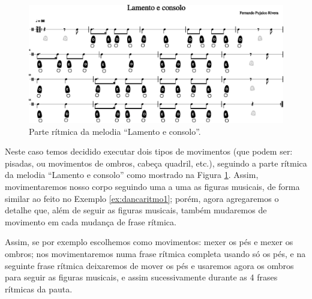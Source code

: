 \begin{figure}
    \centering
    \includegraphics[width=\textwidth]{chapters/cap-musicalidade-tecnica/lamento-e-consolo-clave-ritmo2-1.eps}
    \caption{Parte rítmica da melodia ``Lamento e consolo''.}
    \label{fig:lamentoconsoloritmo2}
\end{figure}

\begin{example}
\label{ex:dancaritmo1macro}
Neste caso temos decidido executar dois tipos de movimentos 
(que podem ser: pisadas, ou movimentos de ombros, cabeça quadril, etc.),
seguindo a parte rítmica da melodia ``Lamento e consolo'' como mostrado na Figura \ref{fig:lamentoconsoloritmo2}.
Assim, movimentaremos nosso corpo seguindo uma a uma as figuras musicais, 
de forma similar ao feito no Exemplo \ref{ex:dancaritmo1}; porém, 
agora  agregaremos o detalhe que, além de seguir as figuras musicais,
também mudaremos de movimento em cada mudança de frase rítmica.

Assim, se por exemplo escolhemos como movimentos:
mexer os pés e mexer os ombros; nos movimentaremos numa frase rítmica completa usando só os pés,
e na seguinte frase rítmica deixaremos de mover os pés e 
usaremos agora os ombros para seguir as figuras musicais,
e assim sucessivamente durante as 4 frases rítmicas da pauta. 
\end{example}

